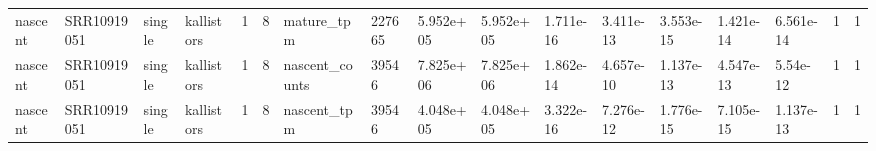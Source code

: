 \begin{tabular}{lllllllllllllllll}
nascent & SRR10919051 & single & kallistors & 1 & 8 & mature\_tpm & 227665 & 5.952e+05 & 5.952e+05 & 1.711e-16 & 3.411e-13 & 3.553e-15 & 1.421e-14 & 6.561e-14 & 1 & 1 \\
nascent & SRR10919051 & single & kallistors & 1 & 8 & nascent\_counts & 39546 & 7.825e+06 & 7.825e+06 & 1.862e-14 & 4.657e-10 & 1.137e-13 & 4.547e-13 & 5.54e-12 & 1 & 1 \\
nascent & SRR10919051 & single & kallistors & 1 & 8 & nascent\_tpm & 39546 & 4.048e+05 & 4.048e+05 & 3.322e-16 & 7.276e-12 & 1.776e-15 & 7.105e-15 & 1.137e-13 & 1 & 1 \\
\bottomrule
\end{tabular}
